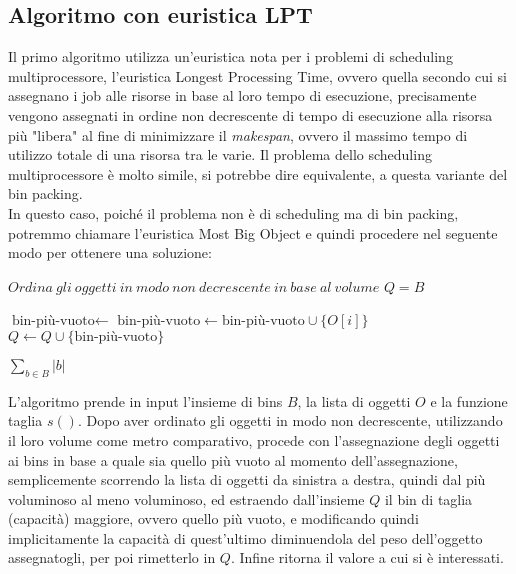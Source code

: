 \subsection{Algoritmo con euristica LPT}
Il primo algoritmo utilizza un'euristica nota per i problemi di scheduling multiprocessore, l'euristica Longest Processing Time, ovvero
quella secondo cui si assegnano i job alle risorse in base al loro tempo di esecuzione, precisamente vengono assegnati in ordine non decrescente di 
tempo di esecuzione alla risorsa più "libera" al fine di minimizzare il \textit{makespan}, ovvero il massimo tempo di utilizzo totale di una risorsa tra le varie.
Il problema dello scheduling multiprocessore è molto simile, si potrebbe dire equivalente, a questa variante del bin packing. \\
In questo caso, poiché il problema non è di scheduling ma di bin packing, potremmo chiamare l'euristica Most Big Object e quindi procedere nel
seguente modo per ottenere una soluzione:
\begin{algorithm}[H]
\begin{algorithmic}[1]

    \State $ Ordina \: gli \: oggetti \: in \: modo \: non \: decrescente \: in \: base \: al \: volume $
    \State $ Q = B $

        \State $ \text{bin-più-vuoto} \leftarrow $ 
        \State $ \text{bin-più-vuoto} \leftarrow \text{bin-più-vuoto} \cup \{O[i]\} $
        \State $ Q \leftarrow Q \cup \{\text{bin-più-vuoto}\} $
    \EndFor
    
    \State \Return $ \displaystyle\sum\limits_{b \in B} |b| $
\EndFunction

\end{algorithmic}
\end{algorithm}

\noindent
L'algoritmo prende in input l'insieme di bins $ B $, la lista di oggetti $ O $ e la funzione taglia $ s() $. Dopo aver ordinato gli oggetti in modo
non decrescente, utilizzando il loro volume come metro comparativo, procede con l'assegnazione degli oggetti ai bins in base a quale sia quello più
vuoto al momento dell'assegnazione, semplicemente scorrendo la lista di oggetti da sinistra a destra, quindi dal più voluminoso al meno voluminoso, ed estraendo
dall'insieme $ Q $ il bin di taglia (capacità) maggiore, ovvero quello più vuoto, e modificando quindi implicitamente la capacità di quest'ultimo diminuendola
del peso dell'oggetto assegnatogli, per poi rimetterlo in $ Q $. Infine ritorna il valore a cui si è interessati. 

